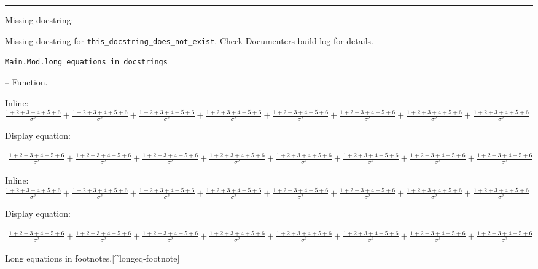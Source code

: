 {\rule{\textwidth}{1pt}}


Missing docstring:



\begin{tcolorbox}[colback=admonition-warning!5!white,colframe=admonition-warning!75!black,title=\textbf{Missing docstring.}]
Missing docstring for \texttt{this\_docstring\_does\_not\_exist}. Check Documenter{\textquotesingle}s build log for details.

\end{tcolorbox}

\hypertarget{15818938160560313688}{\texttt{Main.Mod.long\_equations\_in\_docstrings}}  -- {Function.}

\begin{adjustwidth}{2em}{0pt}

Inline: \(\frac{1+2+3+4+5+6}{\sigma^2} + \frac{1+2+3+4+5+6}{\sigma^2} + \frac{1+2+3+4+5+6}{\sigma^2} + \frac{1+2+3+4+5+6}{\sigma^2} + \frac{1+2+3+4+5+6}{\sigma^2} + \frac{1+2+3+4+5+6}{\sigma^2} + \frac{1+2+3+4+5+6}{\sigma^2} + \frac{1+2+3+4+5+6}{\sigma^2}\)

Display equation:

\begin{equation*}
\begin{split}\frac{1+2+3+4+5+6}{\sigma^2} + \frac{1+2+3+4+5+6}{\sigma^2} + \frac{1+2+3+4+5+6}{\sigma^2} + \frac{1+2+3+4+5+6}{\sigma^2} + \frac{1+2+3+4+5+6}{\sigma^2} + \frac{1+2+3+4+5+6}{\sigma^2} + \frac{1+2+3+4+5+6}{\sigma^2} + \frac{1+2+3+4+5+6}{\sigma^2}\end{split}\end{equation*}
\begin{tcolorbox}[colback=admonition-note!5!white,colframe=admonition-note!75!black,title=\textbf{Long equations in admonitions}]
Inline: \(\frac{1+2+3+4+5+6}{\sigma^2} + \frac{1+2+3+4+5+6}{\sigma^2} + \frac{1+2+3+4+5+6}{\sigma^2} + \frac{1+2+3+4+5+6}{\sigma^2} + \frac{1+2+3+4+5+6}{\sigma^2} + \frac{1+2+3+4+5+6}{\sigma^2} + \frac{1+2+3+4+5+6}{\sigma^2} + \frac{1+2+3+4+5+6}{\sigma^2}\)

Display equation:

\begin{equation*}
\begin{split}\frac{1+2+3+4+5+6}{\sigma^2} + \frac{1+2+3+4+5+6}{\sigma^2} + \frac{1+2+3+4+5+6}{\sigma^2} + \frac{1+2+3+4+5+6}{\sigma^2} + \frac{1+2+3+4+5+6}{\sigma^2} + \frac{1+2+3+4+5+6}{\sigma^2} + \frac{1+2+3+4+5+6}{\sigma^2} + \frac{1+2+3+4+5+6}{\sigma^2}\end{split}\end{equation*}
\end{tcolorbox}
Long equations in footnotes.[{\textasciicircum}longeq-footnote]


\end{adjustwidth}
